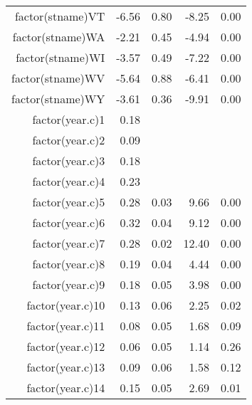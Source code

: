 \begin{table}[ht]
\begin{tabular}{rrrrr}
  factor(stname)VT & -6.56 & 0.80 & -8.25 & 0.00 \\ 
  factor(stname)WA & -2.21 & 0.45 & -4.94 & 0.00 \\ 
  factor(stname)WI & -3.57 & 0.49 & -7.22 & 0.00 \\ 
  factor(stname)WV & -5.64 & 0.88 & -6.41 & 0.00 \\ 
  factor(stname)WY & -3.61 & 0.36 & -9.91 & 0.00 \\ 
  factor(year.c)1 & 0.18 &  &  &  \\ 
  factor(year.c)2 & 0.09 &  &  &  \\ 
  factor(year.c)3 & 0.18 &  &  &  \\ 
  factor(year.c)4 & 0.23 &  &  &  \\ 
  factor(year.c)5 & 0.28 & 0.03 & 9.66 & 0.00 \\ 
  factor(year.c)6 & 0.32 & 0.04 & 9.12 & 0.00 \\ 
  factor(year.c)7 & 0.28 & 0.02 & 12.40 & 0.00 \\ 
  factor(year.c)8 & 0.19 & 0.04 & 4.44 & 0.00 \\ 
  factor(year.c)9 & 0.18 & 0.05 & 3.98 & 0.00 \\ 
  factor(year.c)10 & 0.13 & 0.06 & 2.25 & 0.02 \\ 
  factor(year.c)11 & 0.08 & 0.05 & 1.68 & 0.09 \\ 
  factor(year.c)12 & 0.06 & 0.05 & 1.14 & 0.26 \\ 
  factor(year.c)13 & 0.09 & 0.06 & 1.58 & 0.12 \\ 
  factor(year.c)14 & 0.15 & 0.05 & 2.69 & 0.01 \\ 
   \hline
\end{tabular}
\end{table}
